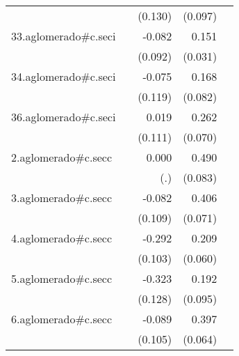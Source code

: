 {\begin{longtable}{l*{4}{D{.}{.}{-1}}}
            &                     &     (0.130)         &     (0.097)         &                     \\
\addlinespace
33.aglomerado#c.seci&                     &      -0.082         &       0.151\sym{***}&                     \\
            &                     &     (0.092)         &     (0.031)         &                     \\
\addlinespace
34.aglomerado#c.seci&                     &      -0.075         &       0.168\sym{*}  &                     \\
            &                     &     (0.119)         &     (0.082)         &                     \\
\addlinespace
36.aglomerado#c.seci&                     &       0.019         &       0.262\sym{***}&                     \\
            &                     &     (0.111)         &     (0.070)         &                     \\
\addlinespace
2.aglomerado#c.secc&                     &       0.000         &       0.490\sym{***}&                     \\
            &                     &         (.)         &     (0.083)         &                     \\
\addlinespace
3.aglomerado#c.secc&                     &      -0.082         &       0.406\sym{***}&                     \\
            &                     &     (0.109)         &     (0.071)         &                     \\
\addlinespace
4.aglomerado#c.secc&                     &      -0.292\sym{**} &       0.209\sym{***}&                     \\
            &                     &     (0.103)         &     (0.060)         &                     \\
\addlinespace
5.aglomerado#c.secc&                     &      -0.323\sym{*}  &       0.192\sym{*}  &                     \\
            &                     &     (0.128)         &     (0.095)         &                     \\
\addlinespace
6.aglomerado#c.secc&                     &      -0.089         &       0.397\sym{***}&                     \\
            &                     &     (0.105)         &     (0.064)         &                     \\

\end{longtable}}
